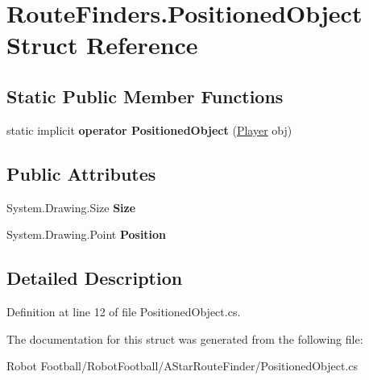 \hypertarget{struct_route_finders_1_1_positioned_object}{\section{Route\-Finders.\-Positioned\-Object Struct Reference}
\label{struct_route_finders_1_1_positioned_object}
}
\subsection*{Static Public Member Functions}
\begin{DoxyCompactItemize}
\item 
\hypertarget{struct_route_finders_1_1_positioned_object_aa63cb0f24e9b469f612227dfca868298}{static implicit {\bfseries operator Positioned\-Object} (\hyperlink{class_robot_football_core_1_1_objects_1_1_player}{Player} obj)}\label{struct_route_finders_1_1_positioned_object_aa63cb0f24e9b469f612227dfca868298}

\end{DoxyCompactItemize}
\subsection*{Public Attributes}
\begin{DoxyCompactItemize}
\item 
\hypertarget{struct_route_finders_1_1_positioned_object_a4feea4a9dd7251143b7cf898f236a533}{System.\-Drawing.\-Size {\bfseries Size}}\label{struct_route_finders_1_1_positioned_object_a4feea4a9dd7251143b7cf898f236a533}

\item 
\hypertarget{struct_route_finders_1_1_positioned_object_a06ec5f57e1e96172b718acf3e275f2a0}{System.\-Drawing.\-Point {\bfseries Position}}\label{struct_route_finders_1_1_positioned_object_a06ec5f57e1e96172b718acf3e275f2a0}

\end{DoxyCompactItemize}


\subsection{Detailed Description}


Definition at line 12 of file Positioned\-Object.\-cs.



The documentation for this struct was generated from the following file\-:\begin{DoxyCompactItemize}
\item 
Robot Football/\-Robot\-Football/\-A\-Star\-Route\-Finder/Positioned\-Object.\-cs\end{DoxyCompactItemize}
